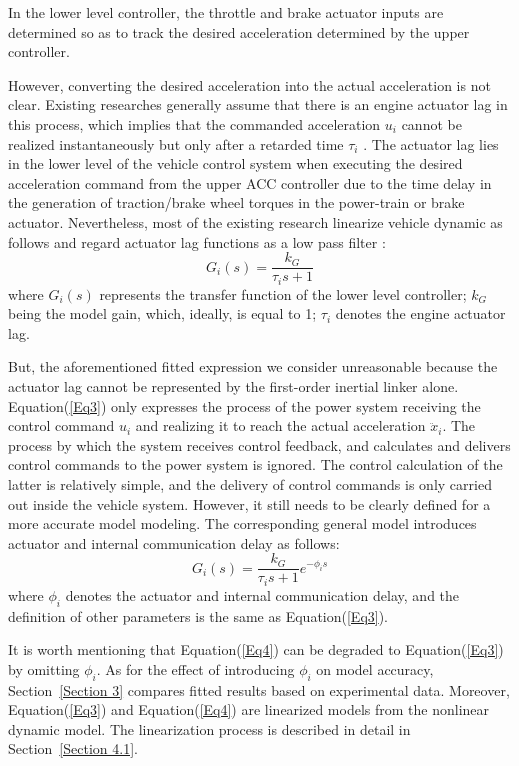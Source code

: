 \documentclass[a4paper]{cas-sc}
\begin{document}
In the lower level controller, the throttle and brake actuator inputs are determined so as to track the desired acceleration determined by the upper controller.

However, converting the desired acceleration into the actual acceleration is not clear. Existing researches generally assume that there is an engine actuator lag in this process, which implies that the commanded acceleration $u_i$ cannot be realized instantaneously but only after a retarded time $\tau_i$ \citep{Ploeg2011}. The actuator lag lies in the lower level of the vehicle control system when executing the desired acceleration command from the upper ACC controller due to the time delay in the generation of traction/brake wheel torques in the power-train or brake actuator. Nevertheless, most of the existing research linearize vehicle dynamic as follows and regard actuator lag functions as a low pass filter \citep{Wang2018a,Naus2010}:
\begin{equation}
  G_i(s)=\frac{k_G}{\tau_is+1}
  \label{Eq3}
\end{equation}
where $G_i(s)$ represents the transfer function of the lower level controller; $k_G$ being the model gain, which, ideally, is equal to 1; $\tau_i$ denotes the engine actuator lag.

But, the aforementioned fitted expression we consider unreasonable because the actuator lag cannot be represented by the first-order inertial linker alone. Equation(\ref{Eq3}) only expresses the process of the power system receiving the control command $u_i$ and realizing it to reach the actual acceleration ${\ddot{x}}_i$. The process by which the system receives control feedback, and calculates and delivers control commands to the power system is ignored. The control calculation of the latter is relatively simple, and the delivery of control commands is only carried out inside the vehicle system. However, it still needs to be clearly defined for a more accurate model modeling. The corresponding general model introduces actuator and internal communication delay as follows:
\begin{equation}
  G_i(s)=\frac{k_G}{\tau_is+1}e^{-\phi_is}
  \label{Eq4}
\end{equation}
where $\phi_i$ denotes the actuator and internal communication delay, and the definition of other parameters is the same as Equation(\ref{Eq3}).

It is worth mentioning that Equation(\ref{Eq4}) can be degraded to Equation(\ref{Eq3}) by omitting $\phi_i$. As for the effect of introducing $\phi_i$ on model accuracy, Section~\ref{Section 3} compares fitted results based on experimental data. Moreover, Equation(\ref{Eq3}) and Equation(\ref{Eq4}) are linearized models from the nonlinear dynamic model. The linearization process is described in detail in Section~\ref{Section 4.1}.
\end{document}
